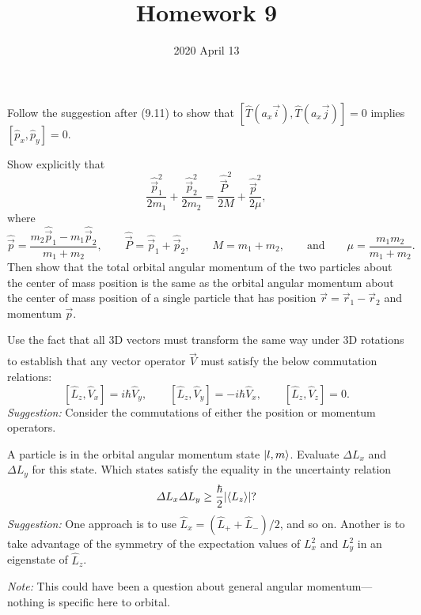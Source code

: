 \documentclass {../phys116}
\title {Homework 9}
\author {}
\date {2020 April 13}
\begin{document}
\begin {exercise} 
  Follow the suggestion after (9.11) to show that
  \([\hat T (a_x \vec i), \hat T (a_x \vec j)] = 0\) implies
  \([\hat p_x, \hat p_y] = 0\).
\end {exercise}

\begin {solution}

\end {solution}

\begin {exercise} 
  Show explicitly that
  \[
    \frac {\hat {\vec p}_1^2} {2 m_1}
    + \frac {\hat {\vec p}_2^2} {2 m_2}
    = \frac {\hat {\vec P}^2} {2 M}
    + \frac {\hat {\vec p}^2} {2 \mu},
  \]
  where
  \[
    \hat {\vec p}
    = \frac {m_2 \hat {\vec p}_1 - m_1 \hat {\vec p}_2} {m_1 + m_2},
    \qquad \hat {\vec P} = \hat {\vec p}_1 + \hat {\vec p}_2,
    \qquad M = m_1 + m_2,
    \qquad \text {and} \qquad \mu = \frac {m_1 m_2} {m_1 + m_2}.
  \]
  Then show that the total orbital angular momentum of the two
  particles about the center of mass position is the same as the
  orbital angular momentum about the center of mass position of a
  single particle that has position \(\vec r = \vec r_1 - \vec r_2\)
  and momentum \(\vec p\).
\end {exercise}

\begin {solution}

\end {solution}

\begin {exercise} 
  Use the fact that all 3D vectors must transform the same way under
  3D rotations to establish that any vector operator \(\hat {\vec V}\)
  must satisfy the below commutation relations:
  \[
    [\hat L_z, \hat V_x] = i \hbar \hat V_y,
    \qquad [\hat L_z, \hat V_y] = -i \hbar \hat V_x,
    \qquad [\hat L_z, \hat V_z] = 0.
  \]
  \textit {Suggestion:} Consider the commutations of either the
  position or momentum operators.
\end {exercise}

\begin {solution}

\end {solution}

\begin {exercise} 
  A particle is in the orbital angular momentum state \(\lvert l, m\rangle\).
  Evaluate \(\Delta L_x\) and \(\Delta L_y\) for this state.  Which
  states satisfy the equality in the uncertainty relation
  \[
    \Delta L_x \Delta L_y \ge \frac \hbar 2 \lvert\langle L_z\rangle\rvert?
  \]
  \textit {Suggestion:} One approach is to use
  \(\hat L_x = (\hat L_+ + \hat L_-)/2\), and so on.  Another is to
  take advantage of the symmetry of the expectation values of
  \(L_x^2\) and \(L_y^2\) in an eigenstate of \(\hat L_z\).

  \textit {Note:} This could have been a question about general
  angular momentum---nothing is specific here to orbital.
\end {exercise}

\begin {solution}

\end {solution}
\end{document}
